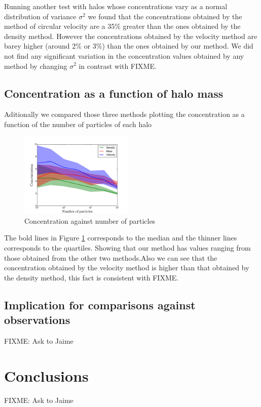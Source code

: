 \documentclass[useAMS,usenatbib]{mn2e}
\begin{document}
Running another test with halos whose concentrations vary as a normal distribution of variance ${\sigma}^2$ we found that the concentrations obtained by the method of circular velocity are a 35\% greater than the ones obtained by the density method. However the concentrations obtained by the velocity method are barey higher (around 2\% or 3\%) than the ones obtained by our method. We did not find any significant variation in the concentration values obtained by any method by changing ${\sigma}^2$ in contrast with FIXME.

\subsection{Concentration as a function of halo mass}
Aditionally we compared those three methods plotting the concentration as a function of the number of particles of each halo 

\begin{figure}
\begin{center}
  \includegraphics[width=0.48\textwidth]{concentration.pdf}
\end{center}
\caption{Concentration against number of particles
    \label{fig:concentrations}}
\end{figure}

The bold lines in Figure \ref{fig:concentrations} corresponds to the median and the thinner lines corresponds to the quartiles. Showing that our method has values ​​ranging from those obtained from the other two methods.Also we can see that the concentration obtained by the velocity method is higher than that obtained by the density method, this fact is consistent with FIXME.
\subsection{Implication for comparisons against observations}
FIXME: Ask to Jaime

\section{Conclusions}
\label{sec:conclusions}
FIXME: Ask to Jaime



\end{document}
